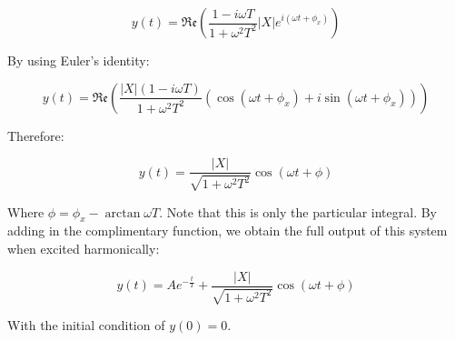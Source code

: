 \documentclass[12pt]{article}
\begin{document}
\[ y(t) = \mathfrak{Re}\left(\frac{1 - i\omega T}{1 + \omega^2T^2}|X|e^{i(\omega t + \phi_x)}\right) \]

By using Euler's identity:

\[ y(t) = \mathfrak{Re}\left(\frac{|X|(1 - i\omega T)}{1 + \omega^2T^2}(\cos{(\omega t + \phi_x)} + i\sin{(\omega t + \phi_x)})\right) \]

Therefore:

\[ y(t) = \frac{|X|}{\sqrt{1 + \omega^2T^2}}\cos{(\omega t + \phi)} \]

Where $\phi = \phi_x - \arctan{\omega T}$. Note that this is only the particular integral. By adding in the complimentary function, we obtain the full output of this system when excited harmonically:

\[ y(t) = Ae^{-\frac{t}{T}} + \frac{|X|}{\sqrt{1 + \omega^2T^2}}\cos{(\omega t + \phi)} \] 

With the initial condition of $y(0) = 0$.
\end{document}
